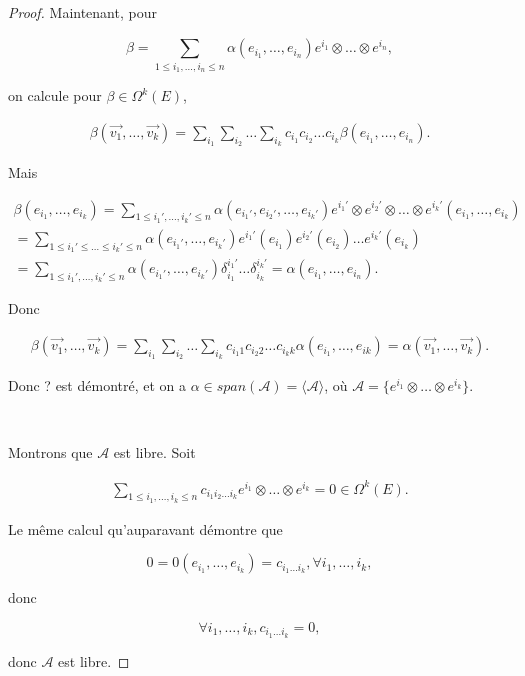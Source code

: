 \documentclass[french]{article}
\theoremstyle{definition}
\theoremstyle{remark}
\begin{document}
\begin{proof}
  Maintenant, pour

  \[
  \beta = \sum_{1 \leq i_1, \dots, i_n \leq n}^{} \alpha(e_{i_1}, \dots,  e_{i_n}) e ^{i_1}\otimes \dots \otimes e ^{i_n},
  \]

  on calcule pour $\beta  \in \Omega ^{k}(E)$,

  \begin{gather*}
    \beta (\overrightarrow{ v_1 }, \dots, \overrightarrow{ v_k })= \sum_{i_1}^{} \sum_{i_2}^{} \dots \sum_{i_k}^{} c _{i_1} c _{i_2} \dots c _{i_k} \beta(e _{i_1}, \dots, e _{i_n}).
  \end{gather*}

  Mais

  \begin{gather*}
    \beta (e _{i_1}, \dots, e _{i_k}) = \sum_{1 \leq i_1', \dots, i_k' \leq n}^{} \alpha( e _{i_1'}, e _{i_2'}, \dots, e _{i_k'}) e ^{i_1'}\otimes e ^{i_2'} \otimes \dots \otimes e ^{i_k'} (e_{i_1},\dots, e_{i_k}) \\
    = \sum_{1 \leq i_1' \leq \dots \leq i_k' \leq n}^{} \alpha(e _{i_1'}, \dots, e _{i_k'}) e ^{i_1'}(e _{i_1}) e ^{i_2'}(e _{i_2}) \dots e ^{i_k'} (e _{i_k}) \\
    =\sum_{1 \leq i_1', \dots, i_k' \leq n}^{} \alpha(e _{i_1'}, \dots, e _{i_k'}) \delta _{i_1} ^{i_1'} \dots \delta _{i_k} ^{i_k'} = \alpha(e _{i_1}, \dots, e _{i_n}).
  \end{gather*}

  Donc

  \begin{gather*}
    \beta (\overrightarrow{ v_1 }, \dots, \overrightarrow{ v_k }  ) = \sum_{i_1}^{} \sum_{i_2}^{} \dots \sum_{i_k}^{} c _{i_1 1} c _{i_2 2} \dots c _{i_k k} \alpha(e _{i_1}, \dots, e _{ik}) = \alpha(\overrightarrow{ v_1 }, \dots, \overrightarrow{ v_k }  )   .
  \end{gather*}

  Donc ? est démontré, et on a $\alpha \in span(\mathscr{A} ) = \langle \mathscr{A} \rangle $, où $\mathscr{A} = \{ e ^{i_1} \otimes \dots \otimes e ^{i_k}\} $.

  \

  Montrons que $\mathscr{A} $ est libre. Soit

  \begin{gather*}
    \sum_{1 \leq i_1 , \dots, i_k \leq n}^{} c _{i_1 i_2 \dots i_k}  e ^{i_1} \otimes \dots \otimes e ^{i_k} = 0 \in \Omega ^{k}(E).
  \end{gather*}

  Le même calcul qu'auparavant démontre que

  \[
  0 = 0(e _{i_1}, \dots, e _{i_k}) = c _{i_1 \dots i_k}, \forall i_1, \dots, i_k,
  \]

  donc

  \[
  \forall i_1, \dots, i_k, c _{i_1 \dots i_k} =0,
  \]

  donc $\mathscr{A} $ est libre.
\end{proof}
\end{document}
